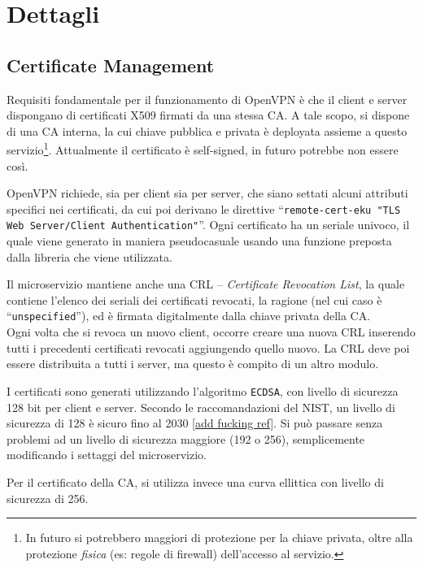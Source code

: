 \section{Dettagli}

\subsection{Certificate Management}
Requisiti fondamentale per il funzionamento di OpenVPN è che il client e server dispongano
di certificati X509 firmati da una stessa CA.
A tale scopo, si dispone di una CA interna, la cui chiave pubblica e privata è deployata
assieme a questo servizio\footnote{In futuro si potrebbero maggiori di protezione per la
chiave privata, oltre alla protezione \textit{fisica} (es: regole di firewall) dell'accesso
al servizio.}. Attualmente il certificato è self-signed, in futuro potrebbe non essere così.

OpenVPN richiede, sia per client sia per server, che siano settati alcuni attributi
specifici nei certificati, da cui poi derivano le direttive
``\texttt{remote-cert-eku "TLS Web Server/Client
Authentication"}''. Ogni certificato ha un seriale univoco, il quale viene generato
in maniera pseudocasuale usando una funzione preposta dalla libreria che viene
utilizzata.

Il microservizio mantiene anche una CRL -- \textit{Certificate Revocation List}, la quale
contiene l'elenco dei seriali dei certificati revocati, la ragione (nel cui caso è ``\texttt{unspecified}''),
ed è firmata digitalmente dalla chiave privata della CA.\\
Ogni volta che si revoca un nuovo client, occorre creare una nuova CRL inserendo tutti i
precedenti certificati revocati aggiungendo quello nuovo. La CRL deve poi essere distribuita 
a tutti i server, ma questo è compito di un altro modulo.

I certificati sono generati utilizzando l'algoritmo \texttt{ECDSA}, con livello di sicurezza
128 bit per client e server. Secondo le raccomandazioni del NIST, un livello di sicurezza di
128 è sicuro fino al 2030 \ref{add fucking ref}. Si può passare senza
problemi ad un livello di sicurezza maggiore (192 o 256), semplicemente modificando i settaggi
del microservizio.

Per il certificato della CA, si utilizza invece una curva ellittica con livello di sicurezza
di 256.


